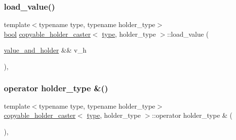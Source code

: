 \subsubsection{\texorpdfstring{load\_value()}{load\_value()}}
{\footnotesize\ttfamily template$<$typename type, typename holder\+\_\+type$>$ \\
\mbox{\hyperlink{asdl_8h_af6a258d8f3ee5206d682d799316314b1}{bool}} \mbox{\hyperlink{structcopyable__holder__caster}{copyable\+\_\+holder\+\_\+caster}}$<$ \mbox{\hyperlink{_s_d_l__opengl_8h_ad5ddf6fca7b585646515660e810e0188}{type}}, holder\+\_\+type $>$\+::load\+\_\+value (\begin{DoxyParamCaption}\item[{\mbox{\hyperlink{structvalue__and__holder}{value\+\_\+and\+\_\+holder}} \&\&}]{v\+\_\+h }\end{DoxyParamCaption})\hspace{0.3cm}{\ttfamily [inline]}, {\ttfamily [protected]}}

\mbox{\label{structcopyable__holder__caster_a1efff1069bd3b73e34bcb6d788820dc4}} 
\subsubsection{\texorpdfstring{operator holder\_type \&()}{operator holder\_type \&()}}
{\footnotesize\ttfamily template$<$typename type, typename holder\+\_\+type$>$ \\
\mbox{\hyperlink{structcopyable__holder__caster}{copyable\+\_\+holder\+\_\+caster}}$<$ \mbox{\hyperlink{_s_d_l__opengl_8h_ad5ddf6fca7b585646515660e810e0188}{type}}, holder\+\_\+type $>$\+::operator holder\+\_\+type \& (\begin{DoxyParamCaption}{ }\end{DoxyParamCaption})\hspace{0.3cm}{\ttfamily [inline]}, {\ttfamily [explicit]}}

\mbox{\label{structcopyable__holder__caster_a303261c970995da9e0e5b08614bd3034}} 
